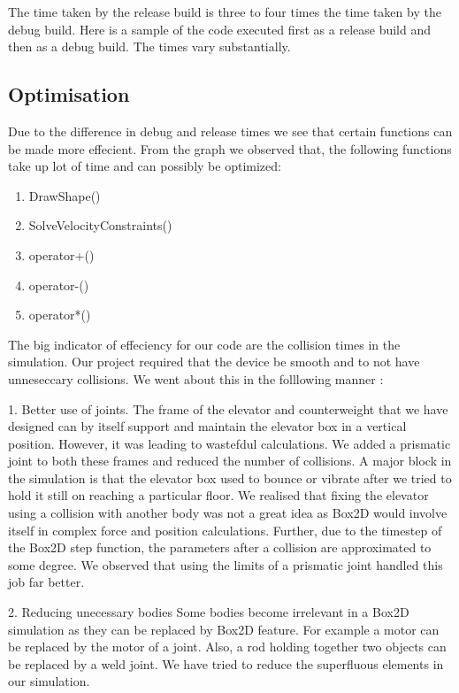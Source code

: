 \documentclass[a4paper,11pt]{article}
\begin{document}
The time taken by the release build is three to four times the time taken by the debug build. Here is a sample of the code executed first as a release build and then as a debug build. The times vary substantially.

\subsection{Optimisation}
Due to the difference in debug and release times we see that certain functions can be made more effecient.
From the graph we observed that, the following functions take up lot of time and can possibly be optimized:

\begin{enumerate}
\item DrawShape()
\item SolveVelocityConstraints()
\item operator+()
\item operator-()
\item operator*()
\end{enumerate}

The big indicator of effeciency for our code are the collision times in the simulation. Our project required that the device be smooth and to not have unneseccary collisions. We went about this in the folllowing manner :

1. Better use of joints. 
The frame of the elevator and counterweight that we have designed can by itself support and maintain the elevator box in a vertical position. However, it was leading to wastefdul calculations. We added a prismatic joint to both these frames and reduced the number of collisions. 
A major block in the simulation is that the elevator box used to bounce or vibrate after we tried to hold it still on reaching a particular floor. We realised that fixing the elevator using a collision with another body was not a great idea as Box2D would involve itself in complex force and position calculations. Further, due to the timestep of the Box2D step function, the parameters after a collision are approximated to some degree. We observed that using the limits of a prismatic joint handled this job far better. 

2. Reducing unecessary bodies
Some bodies become irrelevant in a Box2D simulation as they can be replaced by Box2D feature. For example a motor can be replaced by the motor of a joint. Also, a rod holding together two objects can be replaced by a weld joint. We have tried to reduce the superfluous elements in our simulation.
\end{document}
